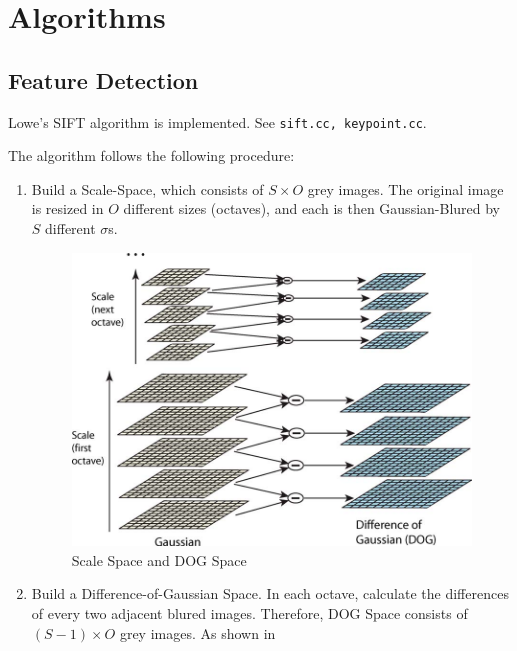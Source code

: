 
\section{Algorithms}
\subsection{Feature Detection}
Lowe's SIFT algorithm is implemented. See \verb|sift.cc, keypoint.cc|.

The algorithm follows the following procedure:
\begin{enumerate}
  \item Build a Scale-Space, which consists of $ S \times O$ grey images.
    The original image is resized in $ O$ different sizes (octaves), and each is then Gaussian-Blured
    by $ S$ different $ \sigma$s.
    \begin{figure}[H]
      \centering
      \includegraphics[scale=0.3]{res/dog.png}
      \caption{Scale Space and DOG Space \label{fig:dog}}
    \end{figure}

  \item Build a Difference-of-Gaussian Space.
    In each octave, calculate the differences of every two adjacent blured images.
    Therefore, DOG Space consists of $ (S - 1) \times O$ grey images.
    As shown in 


\end{enumerate}
